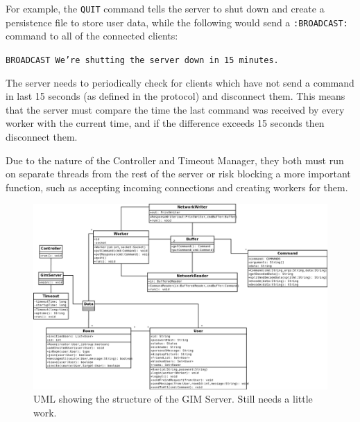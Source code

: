 For example, the \texttt{QUIT} command tells the server to shut down and create a persistence file to store user data, while the following would send a \texttt{:BROADCAST:} command to all of the connected clients:

\texttt{BROADCAST We're shutting the server down in 15 minutes.}

The server needs to periodically check for clients which have not send a command in last 15 seconds (as defined in the protocol) and disconnect them. This means that the server must compare the time the last command was received by every worker with the current time, and if the difference exceeds 15 seconds then disconnect them.

Due to the nature of the Controller and Timeout Manager, they both must run on separate threads from the rest of the server or risk blocking a more important function, such as accepting incoming connections and creating workers for them.

\begin{landscape}
    \begin{figure}
        \begin{center}
            \includegraphics[scale=0.5]{Design/diagrams/server_uml.png}
            \caption{UML showing the structure of the GIM Server. Still needs a little work.}
            \label{umlDia}
        \end{center}
    \end{figure}
\end{landscape}
